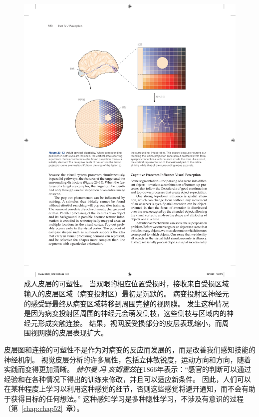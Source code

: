 \begin{figure}[htbp]
	\centering
	\includegraphics[width=1.0\linewidth]{chap23/fig_23_13}
	\caption{成人皮层的可塑性。
		当双眼的相应位置受损时，接收来自受损区域输入的皮层区域（病变投射区）最初是沉默的。
		病变投射区神经元的感受野最终从病变区域转移到周围完整的视网膜。
		发生这种情况是因为病变投射区周围的神经元会萌发侧枝，这些侧枝与区域内的神经元形成突触连接。
		结果，视网膜受损部分的皮层表现缩小，而周围视网膜的皮层表现扩大。}
	\label{fig:23_13}
\end{figure}


皮层图和连接的可塑性不是作为对病变的反应而发展的，而是改善我们感知技能的神经机制。
视觉皮层分析的许多属性，包括立体敏锐度，运动方向和方向，随着实践而变得更加清晰。
\textit{赫尔曼$\cdot$冯$\cdot$亥姆霍兹}在1866年表示：“感官的判断可以通过经验和在各种情况下得出的训练来修改，并且可以适应新条件。
因此，人们可以在某种程度上学习以利用这种感觉的细节，否则这些感觉将避开通知，而不会有助于获得目标的任何想法。” 
这种感知学习是多种隐性学习，不涉及有意识的过程（第~\ref{chap:chap52}~章）。


